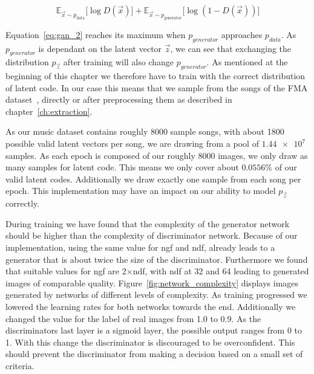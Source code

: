             \begin{equation}
                \mathbb{E}_{\vec{x} \sim p_{\text{data}}}
                    \bigl[ \log D(\vec{x}) \bigr] +
                \mathbb{E}_{\vec{x} \sim p_{\text{generator}}}
                    \bigl[ \log \left( 1 - D(\vec{x}) \right) \bigr]
                \label{eq:gan_2}
            \end{equation}

            Equation~\ref{eq:gan_2} reaches its maximum when $p_{generator}$ approaches $p_{data}$. As $p_{generator}$ is dependant on the latent vector $\vec{z}$, we can see that exchanging the distribution $p_{\vec{z}}$ after training will also change $p_{generator}$. As mentioned at the beginning of this chapter we therefore have to train with the correct distribution of latent code. In our case this means that we sample from the songs of the FMA dataset~\cite{FMA}, directly or after preprocessing them as described in chapter~\ref{ch:extraction}.

            As our music dataset contains roughly 8000 sample songs, with about 1800 possible valid latent vectors per song, we are drawing from a pool of $\num{1.44e7}$ samples. As each epoch is composed of our roughly 8000 images, we only draw as many samples for latent code. This means we only cover about $0.0556\%$ of our valid latent codes. Additionally we draw exactly one sample from each song per epoch. This implementation may have an impact on our ability to model $p_{\vec{z}}$ correctly.

            During training we have found that the complexity of the generator network should be higher than the complexity of discriminator network. Because of our implementation, using the same value for ngf and ndf, already leads to a generator that is about twice the size of the discriminator. Furthermore we found that suitable values for ngf are 2$\times$ndf, with ndf at 32 and 64 leading to generated images of comparable quality. Figure~\ref{fig:network_complexity} displays images generated by networks of different levels of complexity. As training progressed we lowered the learning rates for both networks towards the end. Additionally we changed the value for the label of real images from 1.0 to 0.9. As the discriminators last layer is a sigmoid layer, the possible output ranges from 0 to 1. With this change the discriminator is discouraged to be overconfident. This should prevent the discriminator from making a decision based on a small set of criteria.

